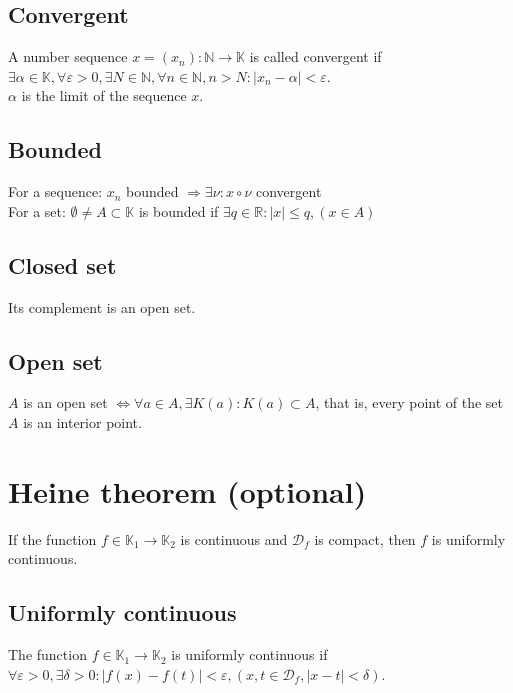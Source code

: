 \documentclass[margin=0px]{article}
\begin{document}
\subsection{Convergent}

A number sequence $x = (x_{n}) : \mathbb{N} \to \mathbb{K}$ is called convergent if $\exists \alpha \in \mathbb{K}, \forall \varepsilon > 0, \exists N \in \mathbb{N}, \forall n \in \mathbb{N}, n > N : |x_{n}-\alpha| < \varepsilon$. \\
$\alpha$ is the limit of the sequence $x$.

\subsection{Bounded}

For a sequence: $x_{n}$ bounded $\Rightarrow \exists \nu : x \circ \nu$ convergent \\
For a set: $\emptyset \neq A \subset \mathbb{K}$ is bounded if $\exists q \in \mathbb{R} : |x| \leq q, (x \in A)$

\subsection{Closed set}

Its complement is an open set.

\subsection{Open set}

$A$ is an open set $\iff \forall a \in A, \exists K(a): K(a) \subset A$, that is, every point of the set $A$ is an interior point.

\section{Heine theorem {\large (optional)}}

If the function $f \in \mathbb{K}_{1} \to \mathbb{K}_{2}$ is continuous and $\mathcal{D}_{f}$ is compact, then $f$ is uniformly continuous.

\subsection{Uniformly continuous}

The function $f \in \mathbb{K}_{1} \to \mathbb{K}_{2}$ is uniformly continuous if $\forall \varepsilon > 0, \exists \delta > 0 : |f(x)-f(t)| < \varepsilon, (x,t \in \mathcal{D}_{f}, |x-t| < \delta)$.
\end{document}
